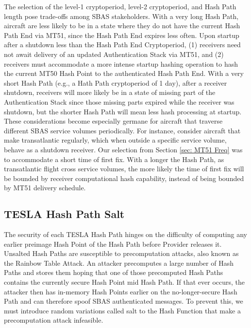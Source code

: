 \documentclass[letterpaper,times]{IONconf/IONconf}
\begin{document}
The selection of the level-1 cryptoperiod, level-2 cryptoperiod, and Hash Path length pose trade-offs among SBAS stakeholders.
With a very long Hash Path, aircraft are less likely to be in a state where they do not have the current Hash Path End via MT51, since the Hash Path End expires less often.
Upon startup after a shutdown less than the Hash Path End Cryptoperiod, (1) receivers need not await delivery of an updated Authentication Stack via MT51, and (2) receivers must accommodate a more intense startup hashing operation to hash the current MT50 Hash Point to the authenticated Hash Path End.
With a very short Hash Path (e.g., a Hath Path cryptoperiod of 1 day), after a receiver shutdown, receivers will more likely be in a state of missing part of the Authentication Stack since those missing parts expired while the receiver was shutdown, but the shorter Hash Path will mean less hash processing at startup.
These considerations become especially germane for aircraft that traverse different SBAS service volumes periodically.
For instance, consider aircraft that make transatlantic regularly, which when outside a specific service volume, behave as a shutdown receiver.
Our selection from Section \ref{sec: MT51 Freq} was to accommodate a short time of first fix.
With a longer the Hash Path, as transatlantic flight cross service volumes, the more likely the time of first fix will be bounded by receiver computational hash capability, instead of being bounded by MT51 delivery schedule. 

\subsection{TESLA Hash Path Salt} \label{sec: salt}

The security of each TESLA Hash Path hinges on the difficulty of computing any earlier preimage Hash Point of the Hash Path before Provider releases it.
Unsalted Hash Paths are susceptible to precomputation attacks, also known as the Rainbow Table Attack.
An attacker precomputes a large number of Hash Paths and stores them hoping that one of those precomputed Hash Paths contains the currently secure Hash Point mid Hash Path.
If that ever occurs, the attacker then has in-memory Hash Points earlier on the no-longer-secure Hash Path and can therefore spoof SBAS authenticated messages.
To prevent this, we must introduce random variations called salt to the Hash Function that make a precomputation attack infeasible.
\end{document}
